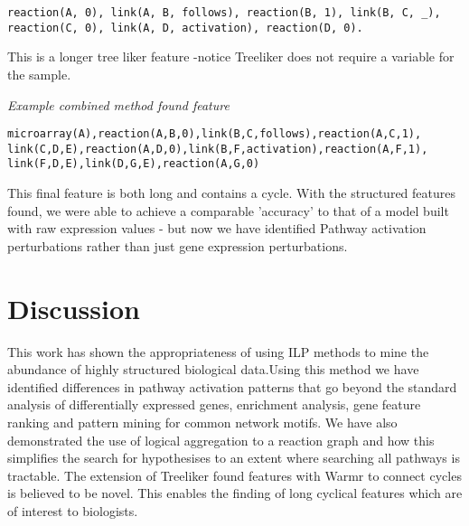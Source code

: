 \documentclass[runningheads,a4paper]{llncs}
\begin{document}
\begin{verbatim}
reaction(A, 0), link(A, B, follows), reaction(B, 1), link(B, C, _),    
reaction(C, 0), link(A, D, activation), reaction(D, 0).
\end{verbatim}
\noindent 
This is a longer tree liker feature -notice Treeliker does not require a variable for the sample.  
\newline

\noindent
{\it{Example combined method found feature}}
\begin{verbatim}
microarray(A),reaction(A,B,0),link(B,C,follows),reaction(A,C,1),
link(C,D,E),reaction(A,D,0),link(B,F,activation),reaction(A,F,1),
link(F,D,E),link(D,G,E),reaction(A,G,0)
\end{verbatim}
\noindent
This final feature is both long and contains a cycle. With the structured features found, we were able to achieve a comparable 'accuracy' to that of a model built with raw expression values - but now we have identified Pathway activation perturbations rather than just gene expression perturbations. 

\section{Discussion}
This work has shown the appropriateness of using ILP methods to mine the abundance of highly structured biological data.Using this method we have identified differences in pathway activation patterns that go beyond the standard analysis of differentially expressed genes, enrichment analysis, gene feature ranking and pattern mining for common network motifs. We have also demonstrated the use of logical aggregation to a  reaction graph and how this simplifies the search for hypothesises to an extent where searching all pathways is tractable. The extension of Treeliker found features with Warmr to connect cycles is believed to be novel. This enables the finding of long cyclical features which are of interest to biologists. 
\newline





\begingroup
\let\clearpage\relax
{}
\endgroup

%

%
%
\end{document}
